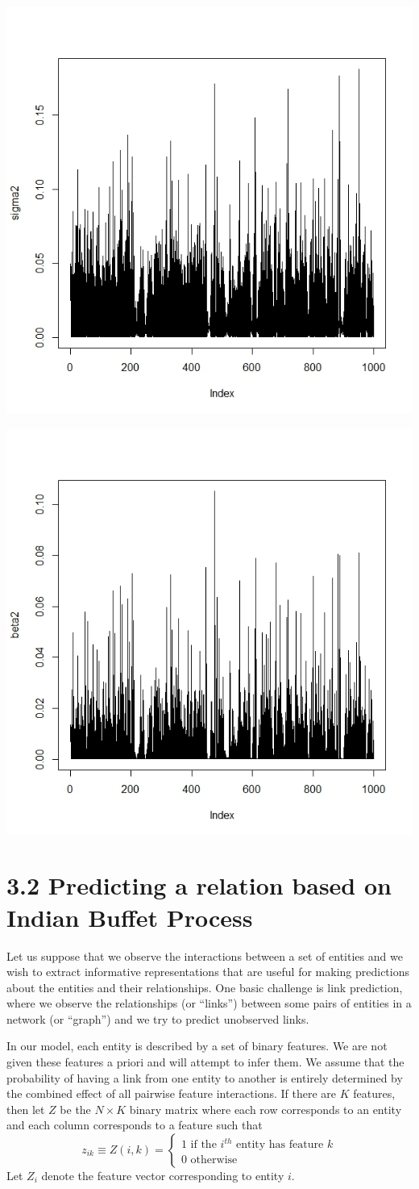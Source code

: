 \documentclass[]{article}
\begin{document}
\begin{center}

	\includegraphics[width=.4\textwidth]{task5/CSMC_sigma2_convergence.jpeg}

	\includegraphics[width=.4\textwidth]{task5/CSMC_beta2_convergence.jpeg}

\end{center}


\newpage

\section*{3.2 Predicting a relation based on Indian Buffet Process}
Let us suppose that we observe the interactions between a set of entities and we wish to extract informative representations that are useful for making predictions about the entities and their relationships. One basic challenge is link prediction, where we observe the relationships (or “links”) between some pairs of entities in a network (or “graph”) and we try to predict unobserved links. 

In our model, each entity is described by a set of binary features. We are not given these features a priori and will attempt to infer them. We assume that the probability of having a link from one entity to another is entirely determined by the combined effect of all pairwise feature interactions. If there are $K$ features, then let $Z$ be the $N \times K$ binary matrix where each row corresponds to an entity and each column corresponds to a feature such that
$$ 
z_{ik} \equiv Z(i,k) = 
\begin{cases}
	1 \text{\ \ \ if the $i^{th}$ entity has feature $k$} \\
	0 \text{\ \ \ otherwise}
\end{cases}
$$
Let $Z_i$ denote the feature vector corresponding to entity $i$.
\end{document}
